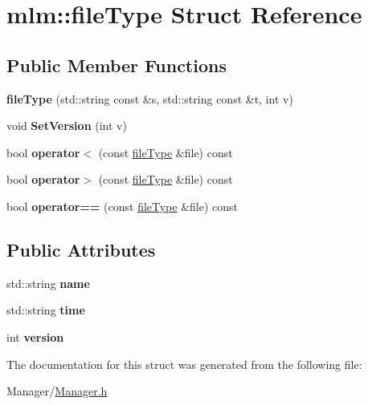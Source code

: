 \hypertarget{structmlm_1_1fileType}{}\section{mlm\+:\+:file\+Type Struct Reference}
\label{structmlm_1_1fileType}
\subsection*{Public Member Functions}
\begin{DoxyCompactItemize}
\item 
\mbox{\label{structmlm_1_1fileType_a83c39b573194921f5413826d20ea0d2a}} 
{\bfseries file\+Type} (std\+::string const \&s, std\+::string const \&t, int v)
\item 
\mbox{\label{structmlm_1_1fileType_ae445592264d8741c655915ea82fddf80}} 
void {\bfseries Set\+Version} (int v)
\item 
\mbox{\label{structmlm_1_1fileType_abf8f0e42e885214d91df289880644038}} 
bool {\bfseries operator$<$} (const \mbox{\hyperlink{structmlm_1_1fileType}{file\+Type}} \&file) const
\item 
\mbox{\label{structmlm_1_1fileType_a6c371f6f0e5680ff5da070076c17a4a9}} 
bool {\bfseries operator$>$} (const \mbox{\hyperlink{structmlm_1_1fileType}{file\+Type}} \&file) const
\item 
\mbox{\label{structmlm_1_1fileType_a3e90064a78c1b6f20af841d1894b1e83}} 
bool {\bfseries operator==} (const \mbox{\hyperlink{structmlm_1_1fileType}{file\+Type}} \&file) const
\end{DoxyCompactItemize}
\subsection*{Public Attributes}
\begin{DoxyCompactItemize}
\item 
\mbox{\label{structmlm_1_1fileType_aee956e5d720c5102fa7685c18da3d73d}} 
std\+::string {\bfseries name}
\item 
\mbox{\label{structmlm_1_1fileType_a08cf96bb5a040198e36050d0422c6876}} 
std\+::string {\bfseries time}
\item 
\mbox{\label{structmlm_1_1fileType_abb9bd6fa11ebe79adc98ef496587a4a2}} 
int {\bfseries version}
\end{DoxyCompactItemize}


The documentation for this struct was generated from the following file\+:\begin{DoxyCompactItemize}
\item 
Manager/\mbox{\hyperlink{Manager_8h}{Manager.\+h}}\end{DoxyCompactItemize}
